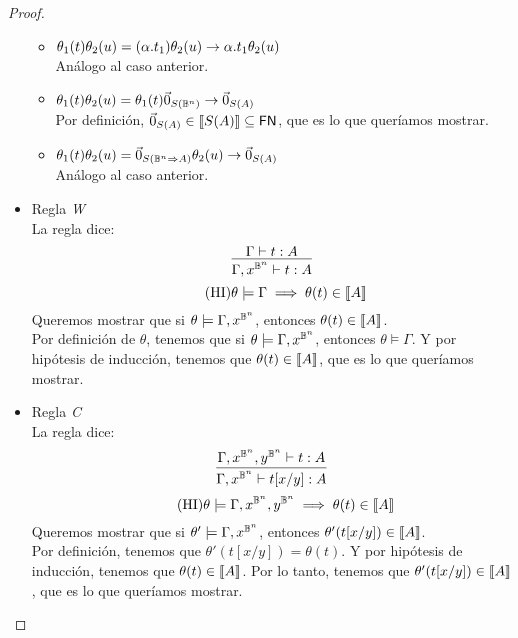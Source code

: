 \begin{proof}
\begin{itemize}
\begin{itemize}
      \item \( \theta_1(t) \theta_2(u) = (\alpha . t_1) \theta_2(u) \rightarrow \alpha . t_1 \theta_2(u) \)
      \\ Análogo al caso anterior.
      \item \( \theta_1(t) \theta_2(u) = \theta_1(t) \vec{0}_{S (\mathbb{B}^n)} \rightarrow \vec{0}_{S (A)} \)
      \\ Por definición, \( \vec{0}_{S (A)} \in \llbracket S(A)\rrbracket \subseteq \mathsf{FN} \), que es lo que queríamos mostrar.
      \item \( \theta_1(t) \theta_2(u) = \vec{0}_{S (\mathbb{B}^n \Rightarrow A)} \theta_2(u) \rightarrow \vec{0}_{S (A)} \)
      \\ Análogo al caso anterior.
    \end{itemize}

    \item Regla \textit{W}
    \\ La regla dice:
    \[ \infer{\Gamma, \vrbl{x}{\qubittype^n} \vdash t : A}{\Gamma \vdash t: A} \]
    \[
      \tag{HI}
      \theta \models \Gamma \implies \theta(t) \in \llbracket A\rrbracket
    \]
    Queremos mostrar que si \( \theta \models \Gamma, x^{\mathbb{B}^n} \), entonces \( \theta(t) \in \llbracket A\rrbracket \).
    \\ Por definición de \( \theta \), tenemos que si \( \theta \models \Gamma, x^{\mathbb{B}^n} \), entonces \( \theta \models \Gamma \). Y por hipótesis de inducción, tenemos que \( \theta(t) \in \llbracket A\rrbracket \), que es lo que queríamos mostrar.

    \item Regla \textit{C}
    \\ La regla dice:
    \[ \infer{\Gamma, \vrbl{x}{\qubittype^n} \vdash t[x/y] : A}{\Gamma, \vrbl{x}{\qubittype^n}, \vrbl{y}{\qubittype^n} \vdash t : A} \]
    \[
      \tag{HI}
      \theta \models \Gamma, x^{\mathbb{B}^n}, y^{\mathbb{B}^n}
      \implies \theta(t) \in \llbracket A\rrbracket
    \]
    Queremos mostrar que si \( \theta' \models \Gamma, x^{\mathbb{B}^n} \), entonces \( \theta'(t[x/y]) \in \llbracket A\rrbracket \).
    \\ Por definición, tenemos que \( \theta'(t[x/y]) = \theta(t) \). Y por hipótesis de inducción, tenemos que \( \theta(t) \in \llbracket A\rrbracket \). Por lo tanto, tenemos que \( \theta'(t[x/y]) \in \llbracket A\rrbracket \), que es lo que queríamos mostrar.


\end{itemize}
\end{proof}
